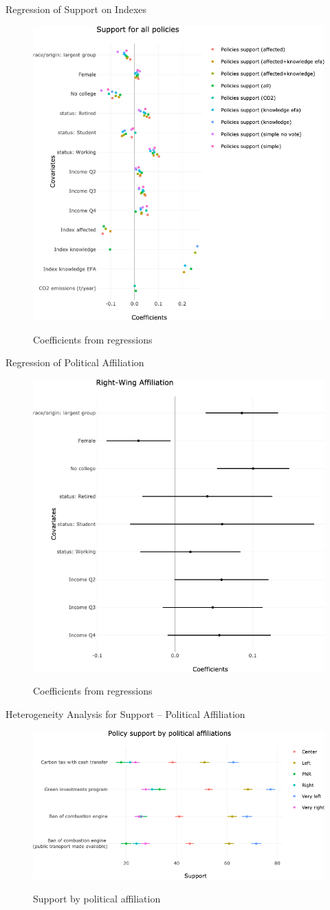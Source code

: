 \documentclass[aspectratio=169,9pt,dvipsnames]{beamer}
\begin{document}
\begin{frame}{Regression of Support on Indexes}%
\vspace{-.5cm}
\begin{figure}[h!]
\caption{Coefficients from regressions}
\includegraphics[width=.5\textwidth]{../figures/US/coef_support_indexes_US.png} \\
\end{figure}
\end{frame}

\begin{frame}{Regression of Political Affiliation}%
\vspace{-.5cm}
\begin{figure}[h!]
\caption{Coefficients from regressions}
\includegraphics[width=.5\textwidth]{../figures/US/coef_Right_US.png} \\
\end{figure}
\end{frame}

\begin{frame}{Heterogeneity Analysis for Support -- Political Affiliation}%
\vspace{-.5cm}
\begin{figure}[h!]
\caption{Support by political affiliation}
\includegraphics[width=.5\textwidth]{../figures/US/support_by_political_US.png} \\
\end{figure}
\end{frame}
\end{document}
